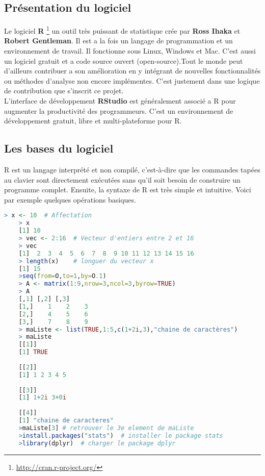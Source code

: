 \documentclass[12pt,a4paper]{scrbook}
\begin{document}
			\subsection{Présentation du logiciel}
Le logiciel \textbf{R} \footnote{\url{http://cran.r-project.org/}} un outil très puissant de statistique crée par \textbf{Ross Ihaka} et \textbf{Robert Gentleman}. Il est a la fois un langage de programmation et un environnement de travail. Il fonctionne sous Linux, Windows et Mac. C'est aussi un logiciel gratuit et a code source ouvert (open-source).Tout le monde peut d'ailleurs contribuer a son amélioration en y intégrant de nouvelles fonctionnalités ou méthodes d'analyse non encore implémentes. C'est justement dans une logique de contribution que s'inscrit ce projet.\\
L'interface de développement \textbf{RStudio} est généralement associé a R pour augmenter la productivité des programmeurs. C'est un environnement de développement gratuit, libre et multi-plateforme pour R.
			\subsection{Les bases du logiciel}
R est un langage interprété et non compilé, c’est-à-dire que les commandes tapées au clavier sont directement exécutées sans qu’il soit besoin de construire un programme complet. Ensuite, la syntaxe de R est très simple et intuitive. Voici par exemple quelques opérations basiques.

	\begin{lstlisting}[language=R]
	> x <- 10  # Affectation
	> x
	[1] 10
	> vec <- 2:16  # Vecteur d'entiers entre 2 et 16
	> vec
	[1]  2  3  4  5  6  7  8  9 10 11 12 13 14 15 16
	> length(x)    # longuer du vecteur x
	[1] 15
	>seq(from=O,to=1,by=O.1) 
	> A <- matrix(1:9,nrow=3,ncol=3,byrow=TRUE)
	> A
	[,1] [,2] [,3]
	[1,]    1    2    3
	[2,]    4    5    6
	[3,]    7    8    9
	> maListe <- list(TRUE,1:5,c(1+2i,3),"chaine de caractères")
	> maListe
	[[1]]
	[1] TRUE		
	
	[[2]]				
	[1] 1 2 3 4 5			
	
	[[3]]
	[1] 1+2i 3+0i
				
	[[4]]
	[1] "chaine de caracteres"
	>maListe[3] # retrouver le 3e element de maListe
	>install.packages("stats")  # installer le package stats
	>library(dplyr)  # charger le package dplyr
			\end{lstlisting}
			
\end{document}
